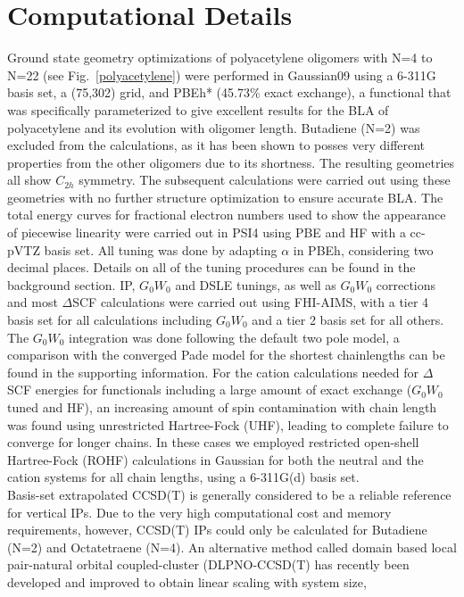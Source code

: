 \documentclass[journal=jctcce,manuscript=article,layout=twocolumn]{achemso}
\begin{document}
\section{Computational Details}
Ground state geometry optimizations of polyacetylene oligomers with N=4 to N=22 (see Fig.~\ref{polyacetylene}) were performed in Gaussian09\cite{g09} using a 6-311G basis set, a (75,302) grid, and PBEh* (45.73\% exact exchange), a functional that was specifically parameterized to give excellent results for the BLA of polyacetylene and its evolution with oligomer length.\cite{jcp_2012_wPBE_PBEh_BLA_MESIE} Butadiene (N=2) was excluded from the calculations, as it has been shown to posses very different properties from the other oligomers due to its shortness.\cite{phys_rev_let_1996_BLA_scaling_bandgap}
The resulting geometries all show $C_{2h}$ symmetry. 
The subsequent calculations were carried out using these geometries with no further structure optimization to ensure accurate BLA.
The total energy curves for fractional electron numbers used to show the appearance of piecewise linearity were carried out in PSI4\cite{psi4} using PBE and HF with a cc-pVTZ basis set.
All tuning was done by adapting $\alpha$ in PBEh, considering two decimal places. Details on all of the tuning procedures can be found in the background section.
IP, $G_0W_0$ and DSLE tunings, as well as $G_0W_0$ corrections and most $\Delta$SCF calculations were carried out using FHI-AIMS\cite{fhi_aims}, with a tier 4 basis set for all calculations including $G_0W_0$ and a 
tier 2 basis set for all others. The $G_0W_0$ integration was done following the default two pole model, a comparison with the converged Pade model for the shortest chainlengths can be found in the supporting information. 
For the cation calculations needed for $\Delta$SCF energies for functionals including a large amount of exact exchange ($G_0W_0$ tuned and HF), an increasing amount of spin contamination with chain length was found using unrestricted Hartree-Fock
(UHF), leading to complete failure to converge for longer chains. In these cases we employed restricted open-shell Hartree-Fock (ROHF) calculations in Gaussian for both the neutral and the cation systems for all chain lengths, using a 6-311G(d) basis set.\\
Basis-set extrapolated CCSD(T) is generally considered to be a reliable reference for vertical IPs.\cite{jctc_2016_accurate_IP_I_ccsdt_reference,GW100,GW_acenes}
Due to the very high computational
cost and memory requirements, however, CCSD(T) IPs could only be calculated for Butadiene (N=2) and Octatetraene (N=4). An alternative method called domain based local pair-natural orbital coupled-cluster (DLPNO-CCSD(T) has recently been developed and improved to obtain linear scaling with system size,
\end{document}
